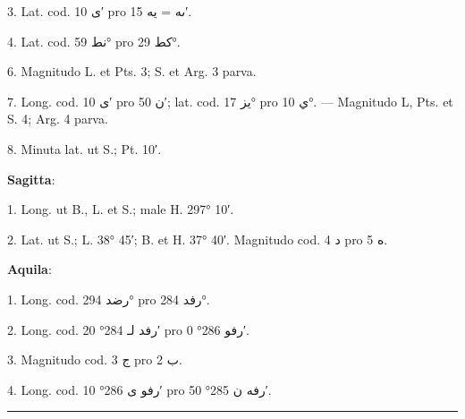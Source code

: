 \documentclass[11pt]{article}
\newcommand{\AbjadZero}{{\NallinoSigns\symbol{"E000}}}
\begin{document}
{\small
\par\hangindent=12mm 3. Lat. cod. \textarabic{ى} 10′ pro \textarabic{ٮه} = \textarabic{يه} 15′.
\par\hangindent=12mm 4. Lat. cod. \textarabic{نط} 59° pro \textarabic{كط} 29°.
\par\hangindent=12mm 6. Magnitudo L. et Pts. 3; S. et Arg. 3 parva.
\par\hangindent=12mm 7. Long. cod. \textarabic{ى} 10′ pro \textarabic{ن} 50′; lat. cod. \textarabic{يز} 17° pro \textarabic{ي} 10°. — Magnitudo L, Pts. et S. 4; Arg. 4 parva.
\par\hangindent=12mm 8. Minuta lat. ut S.; Pt. 10′.
\par\hspace*{8mm}\textbf{Sagitta}:
\par\hangindent=12mm 1. Long. ut B., L. et S.; male H. 297° 10′.
\par\hangindent=12mm 2. Lat. ut S.; L. 38° 45′; B. et H. 37° 40′. Magnitudo cod. \textarabic{د} 4 pro \textarabic{ه} 5.
\par\hspace*{8mm}\textbf{Aquila}:
\par\hangindent=12mm 1. Long. cod. \textarabic{رضد} 294° pro \textarabic{رفد} 284°.
\par\hangindent=12mm 2. Long. cod. \textarabic{رفد لـ} 284° 20′ pro \textarabic{رفو \AbjadZero{}} 286° 0′.
\par\hangindent=12mm 3. Magnitudo cod. \textarabic{ج} 3 pro \textarabic{ب} 2.
\par\hangindent=12mm 4. Long. cod. \textarabic{رفو ى} 286° 10′ pro \textarabic{رفه ن} 285° 50′.
\par}
\clearpage
\noindent{}\par\vspace{-1mm}\noindent\rule{\textwidth}{.4pt}\par\vspace{2mm}
\end{document}
